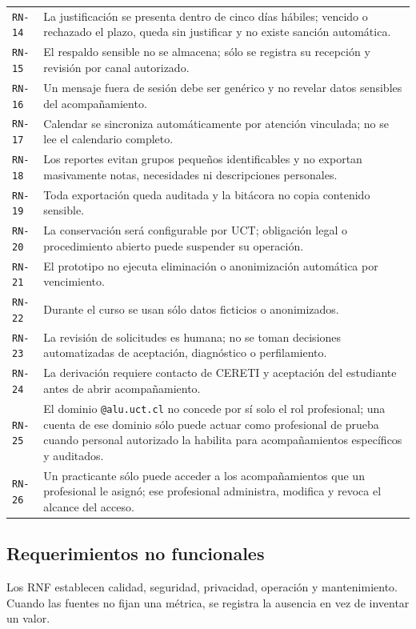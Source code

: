 \documentclass[10pt,a4paper,oneside]{article}
\newcommand{\id}[1]{\texttt{#1}}
\begin{document}
\begin{longtable}{@{}L{0.065\textwidth}L{0.92\textwidth}@{}}
\id{RN-14} & La justificación se presenta dentro de cinco días hábiles; vencido o rechazado el plazo, queda sin justificar y no existe sanción automática.\\
\id{RN-15} & El respaldo sensible no se almacena; sólo se registra su recepción y revisión por canal autorizado.\\
\id{RN-16} & Un mensaje fuera de sesión debe ser genérico y no revelar datos sensibles del acompañamiento.\\
\id{RN-17} & Calendar se sincroniza automáticamente por atención vinculada; no se lee el calendario completo.\\
\id{RN-18} & Los reportes evitan grupos pequeños identificables y no exportan masivamente notas, necesidades ni descripciones personales.\\
\id{RN-19} & Toda exportación queda auditada y la bitácora no copia contenido sensible.\\
\id{RN-20} & La conservación será configurable por UCT; obligación legal o procedimiento abierto puede suspender su operación.\\
\id{RN-21} & El prototipo no ejecuta eliminación o anonimización automática por vencimiento.\\
\id{RN-22} & Durante el curso se usan sólo datos ficticios o anonimizados.\\
\id{RN-23} & La revisión de solicitudes es humana; no se toman decisiones automatizadas de aceptación, diagnóstico o perfilamiento.\\
\id{RN-24} & La derivación requiere contacto de CERETI y aceptación del estudiante antes de abrir acompañamiento.\\
\id{RN-25} & El dominio \texttt{@alu.uct.cl} no concede por sí solo el rol profesional; una cuenta de ese dominio sólo puede actuar como profesional de prueba cuando personal autorizado la habilita para acompañamientos específicos y auditados.\\
\id{RN-26} & Un practicante sólo puede acceder a los acompañamientos que un profesional le asignó; ese profesional administra, modifica y revoca el alcance del acceso.\\
\end{longtable}
\normalsize

\subsection{Requerimientos no funcionales}

Los RNF establecen calidad, seguridad, privacidad, operación y mantenimiento. Cuando las fuentes no fijan una métrica, se registra la ausencia en vez de inventar un valor.
\end{document}
